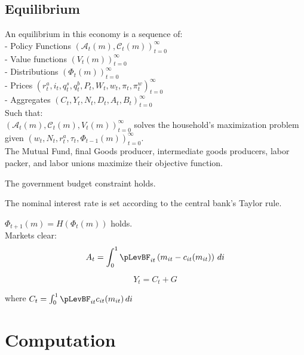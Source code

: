 \documentclass[titlepage]{\econtex}\providecommand{\texname}{BufferStockTheory}
\begin{document}
\hypertarget{Equilibrium}{}
\subsection{Equilibrium}


An equilibrium in this economy is a sequence of: \\

- Policy Functions $\left( \mathcal{A}_{t}(m) , \mathcal{C}_{t}(m) \right )_{t=0}^{\infty}$ \\

- Value functions $ \left( V_{t}(m) \right)_{t=0}^{\infty}$\\

- Distributions $ \left(\Phi_{t}(m) \right)_{t=0}^{\infty}$\\

- Prices $ \left( r^{a}_{t}, i_{t}, q^{s}_{t}, q^{b}_{t}, P_{t}, W_{t} , w_{t} , \pi_{t}, \pi^{w}_{t} \right) _{t=0}^{\infty}$\\

- Aggregates $ \left(C_{t}, Y_{t} , N_{t},D_{t} , A_{t} , B_{t} \right)_{t=0}^{\infty}$\\

Such that: \\

$ \left( \mathcal{A}_{t}(m) , \mathcal{C}_{t}(m), V_{t}(m)\right)_{t=0}^{\infty}$  solves the household's maximization problem given $  \left( w_{t}, N_{t},  r^{a}_{t}, \tau_{t}, \Phi_{t-1}(m)\right)_{t=0}^{\infty}$.\\

The Mutual Fund, final Goods producer, intermediate goods producers, labor packer, and labor unions maximize their objective function.

The government budget constraint holds.

The nominal interest rate is set according to the central bank's Taylor rule.


$ \Phi_{t+1}(m) = H(\Phi_{t}(m))$ holds.\\


Markets clear:\\

 $$ A_t =  \int_{0}^{1} \pLevBF_{it}\left( m_{it} - c_{it}(m_{it})\right) \, di $$
 
 $$ Y_t = C_{t} +G $$
 
 where $C_{t} =  \int_{0}^{1} \pLevBF_{it} c_{it}(m_{it})\, di $


\hypertarget{Computation}{}
\section{Computation}
\end{document}
